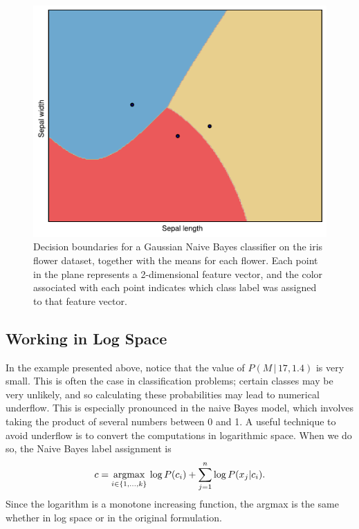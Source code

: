 \begin{figure}
	\centering
	\includegraphics[width=.90\textwidth]{decision_boundary}
	\caption{Decision boundaries for a Gaussian Naive Bayes classifier on the iris flower dataset, together with the means
for each flower. Each point in the plane represents a 2-dimensional feature vector, and the color associated with each point indicates which class label was assigned to that feature vector.}
	\label{fig:decision_boundary}
\end{figure}

\subsection*{Working in Log Space}
In the example presented above, notice that the value of $P(M\,|\,17,1.4)$ is very small. 
This is often the case in classification problems; certain classes may be very unlikely, and so calculating these probabilities may lead to numerical underflow.
This is especially pronounced in the naive Bayes model, which involves taking the product of several numbers between 
0 and 1.
A useful technique to avoid underflow is to convert the computations in logarithmic space. 
When we do so, the Naive Bayes label assignment is
\[
c = \underset{i \in \{1, \ldots, k\}}{\mbox{argmax}}\, \log P(c_i) + \sum_{j=1}^n \log P(x_j|c_i).
\] 
Since the logarithm is a monotone increasing function, the argmax is the same whether in log space or
in the original formulation.

